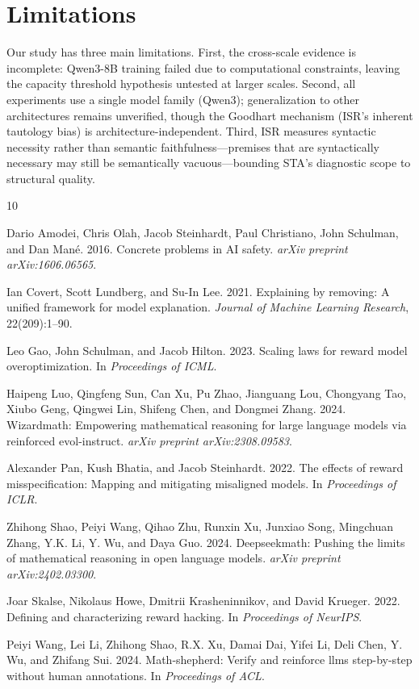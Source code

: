 \documentclass[11pt,a4paper]{article}
\newcommand{\isr}{\textsc{ISR}}
\newcommand{\sta}{\textsc{STA}}
\begin{document}
\section*{Limitations}

Our study has three main limitations.
First, the cross-scale evidence is incomplete: Qwen3-8B training failed due to computational constraints, leaving the capacity threshold hypothesis untested at larger scales.
Second, all experiments use a single model family (Qwen3); generalization to other architectures remains unverified, though the Goodhart mechanism (\isr{}'s inherent tautology bias) is architecture-independent.
Third, \isr{} measures syntactic necessity rather than semantic faithfulness---premises that are syntactically necessary may still be semantically vacuous---bounding \sta{}'s diagnostic scope to structural quality.

\begin{thebibliography}{10}

Dario Amodei, Chris Olah, Jacob Steinhardt, Paul Christiano, John Schulman, and Dan Man\'{e}. 2016.
Concrete problems in AI safety.
{\em arXiv preprint arXiv:1606.06565}.

Ian Covert, Scott Lundberg, and Su-In Lee. 2021.
Explaining by removing: A unified framework for model explanation.
{\em Journal of Machine Learning Research}, 22(209):1--90.

Leo Gao, John Schulman, and Jacob Hilton. 2023.
Scaling laws for reward model overoptimization.
In {\em Proceedings of ICML}.

Haipeng Luo, Qingfeng Sun, Can Xu, Pu Zhao, Jianguang Lou, Chongyang Tao, Xiubo Geng, Qingwei Lin, Shifeng Chen, and Dongmei Zhang. 2024.
Wizardmath: Empowering mathematical reasoning for large language models via reinforced evol-instruct.
{\em arXiv preprint arXiv:2308.09583}.

Alexander Pan, Kush Bhatia, and Jacob Steinhardt. 2022.
The effects of reward misspecification: Mapping and mitigating misaligned models.
In {\em Proceedings of ICLR}.

Zhihong Shao, Peiyi Wang, Qihao Zhu, Runxin Xu, Junxiao Song, Mingchuan Zhang, Y.K. Li, Y. Wu, and Daya Guo. 2024.
Deepseekmath: Pushing the limits of mathematical reasoning in open language models.
{\em arXiv preprint arXiv:2402.03300}.

Joar Skalse, Nikolaus Howe, Dmitrii Krasheninnikov, and David Krueger. 2022.
Defining and characterizing reward hacking.
In {\em Proceedings of NeurIPS}.

Peiyi Wang, Lei Li, Zhihong Shao, R.X. Xu, Damai Dai, Yifei Li, Deli Chen, Y. Wu, and Zhifang Sui. 2024.
Math-shepherd: Verify and reinforce llms step-by-step without human annotations.
In {\em Proceedings of ACL}.

\end{thebibliography}
\end{document}
